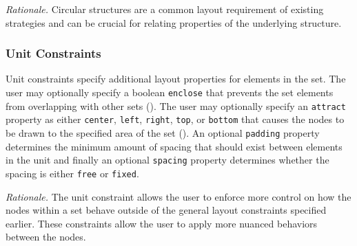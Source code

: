 \emph{Rationale.} Circular structures are a common layout requirement of
existing strategies  and can be crucial for relating
properties of the underlying structure.

\subsubsection{Unit Constraints}
 Unit constraints specify additional layout
properties for elements in the set. The user may optionally specify a
boolean \texttt{enclose} that prevents the set elements from overlapping
with other sets (). The user may optionally specify an
\texttt{attract} property as either \texttt{center}, \texttt{left},
\texttt{right}, \texttt{top}, or \texttt{bottom} that causes the nodes to
be drawn to the specified area of the set (). An optional
\texttt{padding} property determines the minimum amount of spacing that
should exist between elements in the unit and finally an optional
\texttt{spacing} property determines whether the spacing is either
\texttt{free} or \texttt{fixed}.



\emph{Rationale.} The unit constraint allows the user to enforce more
control on how the nodes within a set behave outside of the general layout
constraints specified earlier. These constraints allow the user to apply
more nuanced behaviors between the nodes.

